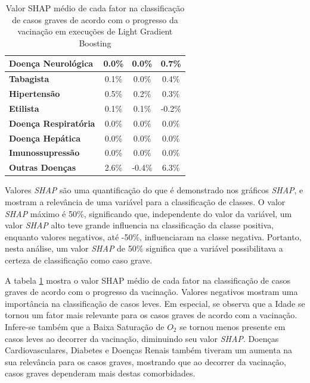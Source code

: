 \begin{table}[H]
\begin{tabular}{|l|c|c|c|}
    \textbf{Doença Neurológica}          & 0.0\%        & 0.0\%                      & 0.7\%                       \\ \hline
    \textbf{Tabagista}                   & 0.1\%        & 0.0\%                      & 0.4\%                       \\ \hline
    \textbf{Hipertensão}                 & 0.5\%        & 0.2\%                      & 0.3\%                       \\ \hline
    \textbf{Etilista}                    & 0.1\%        & 0.1\%                      & -0.2\%                      \\ \hline
    \textbf{Doença Respiratória}         & 0.0\%        & 0.0\%                      & 0.0\%                       \\ \hline
    \textbf{Doença Hepática}             & 0.0\%        & 0.0\%                      & 0.0\%                       \\ \hline
    \textbf{Imunossupressão}             & 0.0\%        & 0.0\%                      & 0.0\%                       \\ \hline
    \textbf{Outras Doenças}              & 2.6\%        & -0.4\%                     & 6.3\%                       \\ \hline
    \end{tabular}
  \caption{\textmd{Valor SHAP médio de cada fator na classificação de casos graves de acordo com o progresso da vacinação em execuções de Light Gradient Boosting}}
  \label{tab:shap-relevancias}
  \end{table}

Valores \textit{SHAP} são uma quantificação do que é demonstrado nos gráficos \textit{SHAP}, e mostram a relevância de uma variável para a classificação de classes. O valor \textit{SHAP} máximo é 50\%, significando que, independente do valor da variável, um valor \textit{SHAP} alto teve grande influencia na classificação da classe positiva, enquanto valores negativos, até -50\%, influenciaram na classe negativa. Portanto, nesta análise, um valor \textit{SHAP} de 50\% significa que a variável possibilitava a certeza de classificação como caso grave.

A tabela \ref{tab:shap-relevancias} mostra o valor SHAP médio de cada fator na classificação de casos graves de acordo com o progresso da vacinação. Valores negativos mostram uma importância na classificação de casos leves. Em especial, se observa que a Idade se tornou um fator mais relevante para os casos graves de acordo com a vacinação. Infere-se também que a Baixa Saturação de $O_2$ se tornou menos presente em casos leves ao decorrer da vacinação, diminuindo seu valor \textit{SHAP}. Doenças Cardiovasculares, Diabetes e Doenças Renais também tiveram um aumenta na sua relevância para os casos graves, mostrando que ao decorrer da vacinação, casos graves dependeram mais destas comorbidades.

